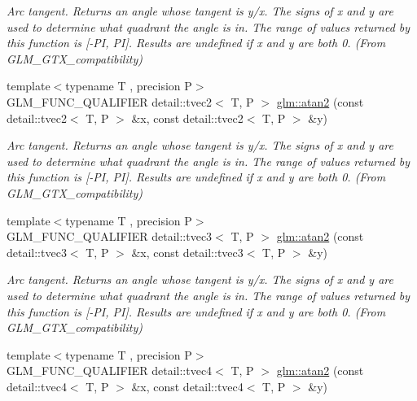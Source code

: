 \begin{DoxyCompactItemize}
\begin{DoxyCompactList}\small\item\em Arc tangent. Returns an angle whose tangent is y/x. The signs of x and y are used to determine what quadrant the angle is in. The range of values returned by this function is \mbox{[}-\/\+PI, PI\mbox{]}. Results are undefined if x and y are both 0. (From G\+L\+M\+\_\+\+G\+T\+X\+\_\+compatibility) \end{DoxyCompactList}\item 
{\footnotesize template$<$typename T , precision P$>$ }\\G\+L\+M\+\_\+\+F\+U\+N\+C\+\_\+\+Q\+U\+A\+L\+I\+F\+I\+ER detail\+::tvec2$<$ T, P $>$ \hyperlink{group__gtx__compatibility_ga9947ea1e628e2823b9276924445e0147}{glm\+::atan2} (const detail\+::tvec2$<$ T, P $>$ \&x, const detail\+::tvec2$<$ T, P $>$ \&y)\hypertarget{group__gtx__compatibility_ga9947ea1e628e2823b9276924445e0147}{}\label{group__gtx__compatibility_ga9947ea1e628e2823b9276924445e0147}

\begin{DoxyCompactList}\small\item\em Arc tangent. Returns an angle whose tangent is y/x. The signs of x and y are used to determine what quadrant the angle is in. The range of values returned by this function is \mbox{[}-\/\+PI, PI\mbox{]}. Results are undefined if x and y are both 0. (From G\+L\+M\+\_\+\+G\+T\+X\+\_\+compatibility) \end{DoxyCompactList}\item 
{\footnotesize template$<$typename T , precision P$>$ }\\G\+L\+M\+\_\+\+F\+U\+N\+C\+\_\+\+Q\+U\+A\+L\+I\+F\+I\+ER detail\+::tvec3$<$ T, P $>$ \hyperlink{group__gtx__compatibility_gac457f8819be9cd8e3f42be17451b750a}{glm\+::atan2} (const detail\+::tvec3$<$ T, P $>$ \&x, const detail\+::tvec3$<$ T, P $>$ \&y)\hypertarget{group__gtx__compatibility_gac457f8819be9cd8e3f42be17451b750a}{}\label{group__gtx__compatibility_gac457f8819be9cd8e3f42be17451b750a}

\begin{DoxyCompactList}\small\item\em Arc tangent. Returns an angle whose tangent is y/x. The signs of x and y are used to determine what quadrant the angle is in. The range of values returned by this function is \mbox{[}-\/\+PI, PI\mbox{]}. Results are undefined if x and y are both 0. (From G\+L\+M\+\_\+\+G\+T\+X\+\_\+compatibility) \end{DoxyCompactList}\item 
{\footnotesize template$<$typename T , precision P$>$ }\\G\+L\+M\+\_\+\+F\+U\+N\+C\+\_\+\+Q\+U\+A\+L\+I\+F\+I\+ER detail\+::tvec4$<$ T, P $>$ \hyperlink{group__gtx__compatibility_ga3b9f0577d1b5d76c0f6ab04e28599fc4}{glm\+::atan2} (const detail\+::tvec4$<$ T, P $>$ \&x, const detail\+::tvec4$<$ T, P $>$ \&y)\hypertarget{group__gtx__compatibility_ga3b9f0577d1b5d76c0f6ab04e28599fc4}{}\label{group__gtx__compatibility_ga3b9f0577d1b5d76c0f6ab04e28599fc4}


\end{DoxyCompactItemize}
